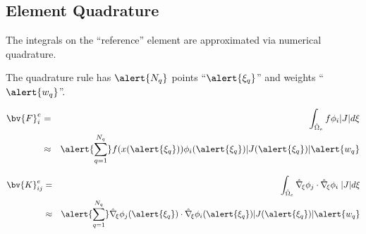 \subsection*{Element Quadrature}
    
\begin{frame}[t]
	\begin{block}{}
	\begin{itemize}    
	\item{
	  The integrals on the ``reference'' element are approximated via numerical
	  quadrature.
	}
	  \visible<2->
	      {
	      \item{The quadrature rule has $\alert{N_q}$ points
		``$\alert{\xi_q}$'' and weights ``$\alert{w_q}$''.}
	      }
	\end{itemize}
	\end{block}
{
	\begin{eqnarray}
	  \nonumber
		\bv{F}^e_{i} &=&
		\int_{\hat{\Omega}_e} f \phi_i |J| d\xi
		\\ \nonumber
		    &\approx&
		    \alert{\sum_{q=1}^{N_q}}
		    f(x(\alert{\xi_q})) \phi_i(\alert{\xi_q})
		    |J(\alert{\xi_q})| \alert{w_q}
	\end{eqnarray}
}

{
	\begin{eqnarray}
	  \nonumber
		\bv{K}^e_{ij} &=&
		\int_{\hat{\Omega}_e}
		\hat{\nabla}_{\!\xi}\phi_j \cdot
		\hat{\nabla}_{\!\xi}\phi_i \;|J| d\xi
		\\ \nonumber
		    &\approx&
		    \alert{\sum_{q=1}^{N_q}}
		    \hat{\nabla}_{\!\xi} \phi_j(\alert{\xi_q}) \cdot
		    \hat{\nabla}_{\!\xi} \phi_i(\alert{\xi_q})
		    |J(\alert{\xi_q})| \alert{w_q}
	\end{eqnarray}
}
\end{frame}
